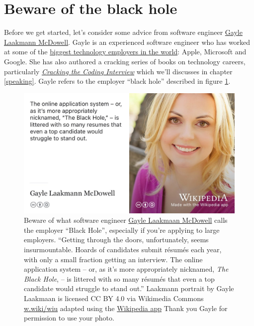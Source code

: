 \documentclass[
]{book}
\begin{document}
\hypertarget{blackhole}{%
\section{Beware of the black hole}\label{blackhole}}

Before we get started, let's consider some advice from software engineer \href{https://en.wikipedia.org/wiki/Gayle_Laakmann_McDowell}{Gayle Laakmann McDowell}. Gayle is an experienced software engineer who has worked at some of the \href{https://en.wikipedia.org/wiki/Big_Tech}{biggest technology employers in the world}: Apple, Microsoft and Google. She has also authored a cracking series of books on technology careers, particularly \emph{\href{https://en.wikipedia.org/wiki/Cracking_the_Coding_Interview}{Cracking the Coding Interview}} \citep{cracking} which we'll discusses in chapter \ref{speaking}. Gayle refers to the employer ``black hole'' described in figure \ref{fig:gayle-fig}.

\begin{figure}

{\centering \includegraphics[width=0.99\linewidth]{images/gayle-black-hole} 

}

\caption{Beware of what software engineer \href{https://en.wikipedia.org/wiki/Gayle_Laakmann_McDowell}{Gayle Laakmaan McDowell} calls the employer ``Black Hole'', especially if you're applying to large employers. ``Getting through the doors, unfortunately, seems insurmountable. Hoards of candidates submit résumés each year, with only a small fraction getting an interview. The online application system -- or, as it's more appropriately nicknamed, \emph{The Black Hole}, -- is littered with so many résumés that even a top candidate would struggle to stand out.'' \citep{blackhole, techcareer} Laakmann portrait by Gayle Laakmaan is licensed CC BY 4.0 via Wikimedia Commons \href{https://w.wiki/wiu}{w.wiki/wiu} adapted using the \href{https://apps.apple.com/us/app/wikipedia/id324715238}{Wikipedia app} Thank you Gayle for permission to use your photo.}\label{fig:gayle-fig}
\end{figure}
\end{document}
